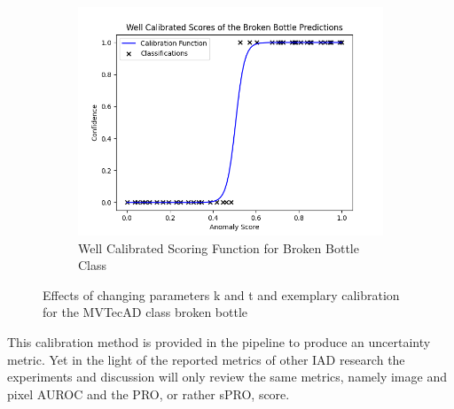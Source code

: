 \begin{figure}[htbp]
\begin{subfigure}[b]{0.3\textwidth}
        \includegraphics[width=\textwidth]{figures/anomaly_calibration_soft.png}
        \caption{Well Calibrated Scoring Function for Broken Bottle Class}
        \label{fig:sub3}
    \end{subfigure}
    \caption{Effects of changing parameters k and t and exemplary calibration for the MVTecAD \cite{MVTEC_Bergmann_2021} class broken bottle}
    \label{fig:main}
\end{figure}

This calibration method is provided in the pipeline to produce an uncertainty metric. Yet in the light of the reported metrics of other IAD research the experiments and discussion will only 
review the same metrics, namely image and pixel AUROC and the PRO, or rather sPRO, score.








